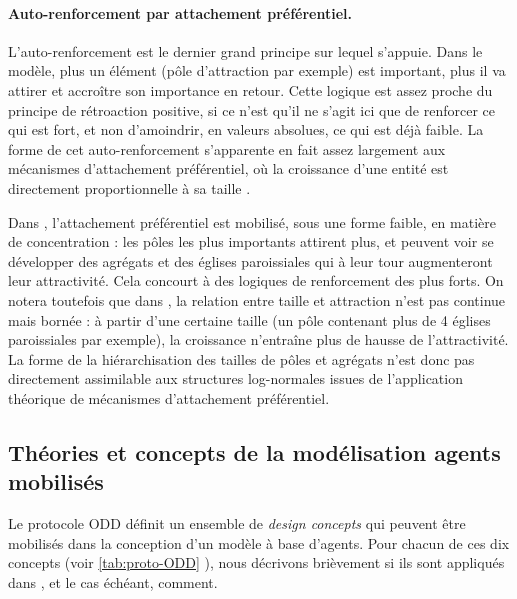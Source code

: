 \paragraph{Auto-renforcement par attachement préférentiel.}
L'auto-renforcement est le dernier grand principe sur lequel \simfeodal{} s'appuie.
Dans le modèle, plus un élément (pôle d'attraction par exemple) est important, plus il va attirer et accroître son importance en retour.
Cette logique est assez proche du principe de rétroaction positive, si ce n'est qu'il ne s'agit ici que de renforcer ce qui est fort, et non d'amoindrir, en valeurs absolues, ce qui est déjà faible.
La forme de cet auto-renforcement s'apparente en fait assez largement aux mécanismes d'attachement préférentiel, où la croissance d'une entité est directement proportionnelle à sa taille \autocite{barabasi_emergence_1999}.

Dans \simfeodal{}, l'attachement préférentiel est mobilisé, sous une forme faible, en matière de concentration : les pôles les plus importants attirent plus, et peuvent voir se développer des agrégats et des églises paroissiales qui à leur tour augmenteront leur attractivité.
Cela concourt à des logiques de renforcement des plus forts.
On notera toutefois que dans \simfeodal{}, la relation entre taille et attraction n'est pas continue mais bornée : à partir d'une certaine taille (un pôle contenant plus de 4 églises paroissiales par exemple), la croissance n'entraîne plus de hausse de l'attractivité.
La forme de la hiérarchisation des tailles de pôles et agrégats n'est donc pas directement assimilable aux structures log-normales issues de l'application théorique de mécanismes d'attachement préférentiel.

\clearpage
\subsection{Théories et concepts de la modélisation agents mobilisés}

Le protocole ODD définit un ensemble de \textit{design concepts} qui peuvent être mobilisés dans la conception d'un modèle à base d'agents.
Pour chacun de ces dix concepts (voir \cref{tab:proto-ODD}
), nous décrivons brièvement si ils sont appliqués dans \simfeodal{}, et le cas échéant, comment.


